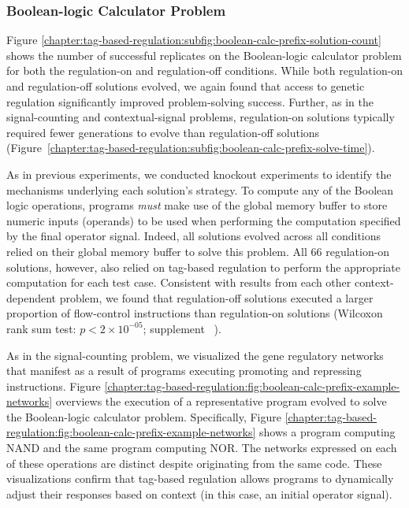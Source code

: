 \subsubsection{Boolean-logic Calculator Problem}
\label{chapter:tag-based-regulation:sec:results:boolean-calc-problem}



Figure \ref{chapter:tag-based-regulation:subfig:boolean-calc-prefix-solution-count} shows the number of successful replicates on the Boolean-logic calculator problem for both the regulation-on and regulation-off conditions.
While both regulation-on and regulation-off solutions evolved, we again found that access to genetic regulation significantly improved problem-solving success.
Further, as in the signal-counting and contextual-signal problems, regulation-on solutions typically required fewer generations to evolve than regulation-off solutions (Figure~\ref{chapter:tag-based-regulation:subfig:boolean-calc-prefix-solve-time}).



As in previous experiments, we conducted knockout experiments to identify the mechanisms underlying each solution's strategy.
To compute any of the Boolean logic operations, programs \textit{must} make use of the global memory buffer to store numeric inputs (operands) to be used when performing the computation specified by the final operator signal. 
Indeed, all solutions evolved across all conditions relied on their global memory buffer to solve this problem.
All 66 regulation-on solutions, however, also relied on tag-based regulation to perform the appropriate computation for each test case.
Consistent with results from each other context-dependent problem, we found that regulation-off solutions executed a larger proportion of flow-control instructions than regulation-on solutions (Wilcoxon rank sum test: $p < 2\times10^{-05}$; supplement \supSecBooleanCalcPrefixAnalysis\ \citep{tag_regulation_supplement_2021}).

As in the signal-counting problem, we visualized the gene regulatory networks that manifest as a result of programs executing promoting and repressing instructions. 
Figure \ref{chapter:tag-based-regulation:fig:boolean-calc-prefix-example-networks} overviews the execution of a representative program evolved to solve the Boolean-logic calculator problem.
Specifically, Figure \ref{chapter:tag-based-regulation:fig:boolean-calc-prefix-example-networks} shows a program computing NAND and the same program computing NOR. 
The networks expressed on each of these operations are distinct despite originating from the same code.
These visualizations confirm that tag-based regulation allows programs to dynamically adjust their responses based on context (in this case, an initial operator signal). 

